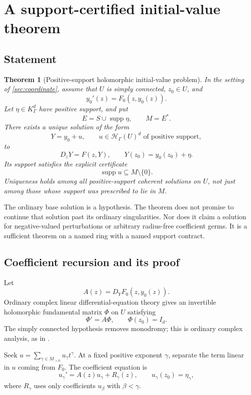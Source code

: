 \documentclass[11pt,letterpaper]{article}
\numberwithin{equation}{section}
\newtheorem{theorem}{Theorem}[section]
\theoremstyle{definition}
\theoremstyle{remark}
\newcommand{\HH}{\mathcal H}
\newcommand{\supp}{\operatorname{supp}}
\begin{document}
\section{A support-certified initial-value theorem}\label{sec:ivp}

\subsection{Statement}
\begin{theorem}[Positive-support holomorphic initial-value problem]\label{thm:ivp}
In the setting of \cref{sec:coordinate}, assume that $U$ is simply connected, $z_0\in U$, and
\[
 y_0'(z)=F_0(z,y_0(z)).
\]
Let $\eta\in K_\Gamma^d$ have positive support, and put
\[
 E=S\cup\supp\eta,\qquad M=E^*.
\]
There exists a unique solution of the form
\begin{equation}\label{eq:coherentivp}
 Y=y_0+u,\qquad u\in\HH_\Gamma(U)^d\text{ of positive support},
\end{equation}
to
\begin{equation}\label{eq:ivp}
 D_zY=F(z,Y),\qquad Y(z_0)=y_0(z_0)+\eta.
\end{equation}
Its support satisfies the explicit certificate
\begin{equation}\label{eq:ivpsupport}
 \supp u\subseteq M\setminus\{0\}.
\end{equation}
Uniqueness holds among all positive-support coherent solutions on $U$, not just among those whose support was prescribed to lie in $M$.
\end{theorem}

The ordinary base solution is a hypothesis. The theorem does not promise to continue that solution past its ordinary singularities. Nor does it claim a solution for negative-valued perturbations or arbitrary radius-free coefficient germs. It is a sufficient theorem on a named ring with a named support contract.

\subsection{Coefficient recursion and its proof}
Let
\[
 A(z)=D_YF_0(z,y_0(z)).
\]
Ordinary complex linear differential-equation theory gives an invertible holomorphic fundamental matrix $\Phi$ on $U$ satisfying
\[
 \Phi'=A\Phi,\qquad\Phi(z_0)=I_d.
\]
The simply connected hypothesis removes monodromy; this is ordinary complex analysis, as in \cite[Chapters 3--4]{Teschl}.

Seek $u=\sum_{\gamma\in M_{>0}}u_\gamma t^\gamma$. At a fixed positive exponent $\gamma$, separate the term linear in $u$ coming from $F_0$. The coefficient equation is
\begin{equation}\label{eq:coefode}
 u_\gamma'=A(z)u_\gamma+R_\gamma(z),\qquad
 u_\gamma(z_0)=\eta_\gamma,
\end{equation}
where $R_\gamma$ uses only coefficients $u_\beta$ with $\beta<\gamma$.
\end{document}
